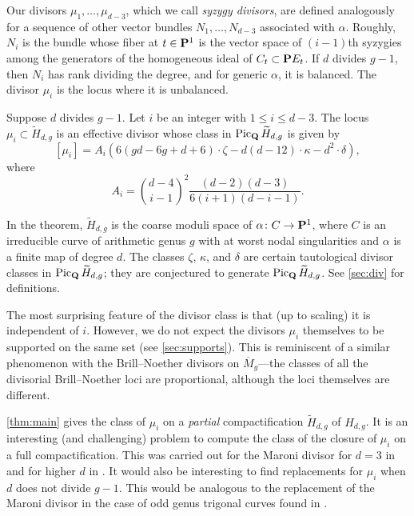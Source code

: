\documentclass{amsart}
\providecommand {\Q}{{\bf Q}}
\renewcommand {\P}{{\bf P}}
\providecommand {\from}{{\colon}}
\providecommand{\Pic}{\operatorname{Pic}}
\numberwithin{equation}{section}
\begin{document}
Our divisors $\mu_1, \dots, \mu_{d-3}$, which we call \emph{syzygy divisors}, are defined analogously for a sequence of other vector bundles $N_1, \dots, N_{d-3}$ associated with $\alpha$.
Roughly, $N_i$ is the bundle whose fiber at $t \in \P^1$ is the vector space of $(i-1)$th syzygies among the generators of the homogeneous ideal of $C_t \subset \P E_t$.
If $d$ divides $g-1$, then $N_i$ has rank dividing the degree, and for generic $\alpha$, it is balanced.
The divisor $\mu_i$ is the locus where it is unbalanced.

\begin{theorem}[Main]
  \label{thm:main}
  Suppose $d$ divides $g-1$.
  Let $i$ be an integer with $1 \leq i \leq d-3$.
  The locus $\mu_i \subset \widetilde H_{d,g}$ is an effective divisor whose class in $\Pic_\Q\widetilde H_{d,g}$ is given by
  \[ [\mu_i] = A_i \left(6(gd-6g+d+6) \cdot \zeta - d(d-12)\cdot \kappa - d^2 \cdot \delta \right),\]
  where
  \[ A_i = {{d-4} \choose {i-1}}^2 \frac{(d-2)(d-3)}{6(i+1)(d-i-1)}.\]
\end{theorem}
In the theorem, $\widetilde H_{d,g}$ is the coarse moduli space of $\alpha \from C \to \P^1$, where $C$ is an irreducible curve of arithmetic genus $g$ with at worst nodal singularities and $\alpha$ is a finite map of degree $d$.
The classes $\zeta$, $\kappa$, and $\delta$ are certain tautological divisor classes in $\Pic_\Q\widetilde H_{d,g}$; they are conjectured to generate $\Pic_\Q\widetilde H_{d,g}$.
See \autoref{sec:div} for definitions.

The most surprising feature of the divisor class is that (up to scaling) it is independent of $i$.
However, we do not expect the divisors $\mu_i$ themselves to be supported on the same set (see \autoref{sec:supports}). 
This is reminiscent of a similar phenomenon with the Brill--Noether divisors on $\overline M_g$---the classes of all the divisorial Brill--Noether loci are proportional, although the loci themselves are different.

\autoref{thm:main} gives the class of $\mu_i$ on a \emph{partial} compactification $\widetilde H_{d,g}$ of $H_{d,g}$.
It is an interesting (and challenging) problem to compute the class of the closure of $\mu_i$ on a full compactification.
This was carried out for the Maroni divisor for $d = 3$ in \cite{deo.pat:13} and for higher $d$ in \cite{gee.kou:17}.
It would also be interesting to find replacements for $\mu_i$ when $d$ does not divide $g-1$.
This would be analogous to the replacement of the Maroni divisor in the case of odd genus trigonal curves found in \cite{deo.pat:13}.
\end{document}
